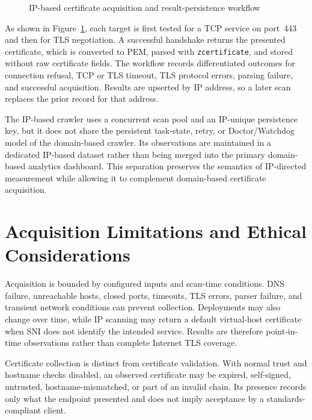 \begin{figure}[H]
  \caption{IP-based certificate acquisition and result-persistence workflow}
  \label{fig:ip-crawler-flow}
\end{figure}

As shown in Figure~\ref{fig:ip-crawler-flow}, each target is first tested for a
TCP service on port~443 and then for TLS negotiation. A successful handshake
returns the presented certificate, which is converted to PEM, parsed with
\texttt{zcertificate}, and stored without raw certificate fields. The workflow
records differentiated outcomes for connection refusal, TCP or TLS timeout,
TLS protocol errors, parsing failure, and successful acquisition. Results are
upserted by IP address, so a later scan replaces the prior record for that
address.

The IP-based crawler uses a concurrent scan pool and an IP-unique persistence
key, but it does not share the persistent task-state, retry, or Doctor/Watchdog
model of the domain-based crawler. Its observations are maintained in a
dedicated IP-based dataset rather than being merged into the primary
domain-based analytics dashboard. This separation preserves the semantics of
IP-directed measurement while allowing it to complement domain-based
certificate acquisition.

\section{Acquisition Limitations and Ethical Considerations}
\label{sec:acquisition-limitations}

Acquisition is bounded by configured inputs and scan-time conditions. DNS
failure, unreachable hosts, closed ports, timeouts, TLS errors, parser failure,
and transient network conditions can prevent collection. Deployments may also
change over time, while IP scanning may return a default virtual-host
certificate when SNI does not identify the intended service. Results are
therefore point-in-time observations rather than complete Internet TLS
coverage.

Certificate collection is distinct from certificate validation. With normal
trust and hostname checks disabled, an observed certificate may be expired,
self-signed, untrusted, hostname-mismatched, or part of an invalid chain. Its
presence records only what the endpoint presented and does not imply acceptance
by a standards-compliant client.

